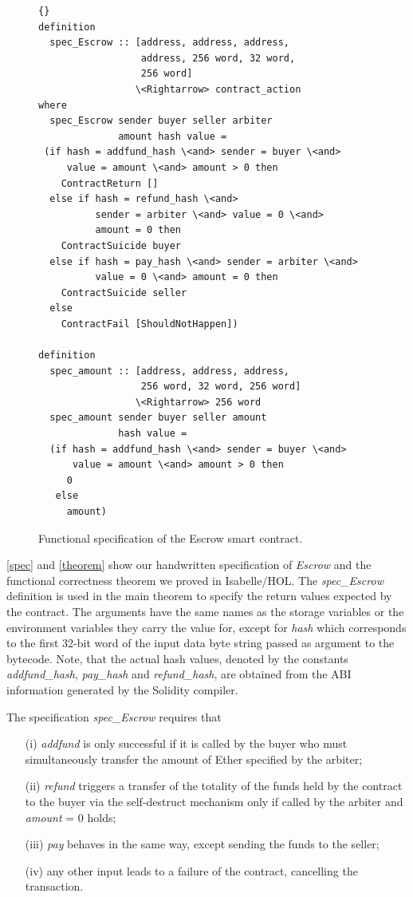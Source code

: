 \documentclass[sigplan,10pt]{acmart}\settopmatter{printfolios=true,printccs=false,printacmref=false}
\begin{document}
\begin{figure}[h]
\begin{lstlisting}[language=Isar,keywords={[3]{addfund\_hash,pay\_hash,refund\_hash,}}]{} 
definition 
  spec_Escrow :: [address, address, address,
                  address, 256 word, 32 word,
                  256 word]
                 \<Rightarrow> contract_action
where
  spec_Escrow sender buyer seller arbiter
              amount hash value =
 (if hash = addfund_hash \<and> sender = buyer \<and>
     value = amount \<and> amount > 0 then
    ContractReturn []
  else if hash = refund_hash \<and>
          sender = arbiter \<and> value = 0 \<and>
          amount = 0 then
    ContractSuicide buyer
  else if hash = pay_hash \<and> sender = arbiter \<and>
          value = 0 \<and> amount = 0 then
    ContractSuicide seller
  else
    ContractFail [ShouldNotHappen])

definition
  spec_amount :: [address, address, address,
                  256 word, 32 word, 256 word]
                 \<Rightarrow> 256 word
  spec_amount sender buyer seller amount
              hash value =
  (if hash = addfund_hash \<and> sender = buyer \<and>
      value = amount \<and> amount > 0 then
     0
   else
     amount)
\end{lstlisting}
\caption{Functional specification of the Escrow smart contract.}
\label{spec}
\end{figure}

\autoref{spec} and \autoref{theorem} show our handwritten specification of \textit{Escrow}
and the functional correctness theorem we proved in Isabelle/HOL.
The \textit{spec\_Escrow} definition is used in the main theorem to specify
the return values expected by the contract.
The arguments have the same names as the storage variables or the environment
variables they carry the value for, except for \textit{hash} which corresponds
to the first 32-bit word of the input data byte string passed as argument
to the bytecode.
%
Note, that the actual hash values, denoted by the constants \textit{addfund\_hash}, \textit{pay\_hash} and
\textit{refund\_hash}, are obtained from the ABI information generated by the Solidity compiler.

The specification \textit{spec\_Escrow} requires that
\begin{enumerate}
\item[(i)] \textit{addfund} is only successful if it is called by the buyer
who must simultaneously transfer the amount of Ether specified by the arbiter;
\item[(ii)] \textit{refund} triggers a transfer of the totality of the funds held
by the contract to the buyer via the self-destruct mechanism only if called by
the arbiter and \textit{amount} = 0 holds;
\item[(iii)] \textit{pay} behaves in the same way, except sending the funds to the seller;
\item[(iv)] any other input leads to a failure of the contract, cancelling
the transaction.
\end{enumerate}
\end{document}
